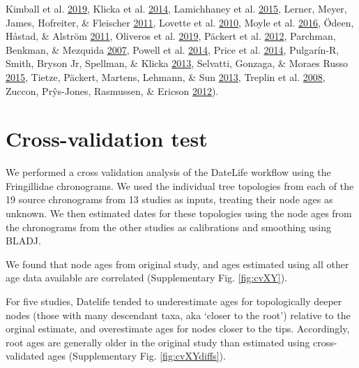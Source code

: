 \documentclass[
  man]{apa6}
\begin{document}
\begin{center}
{Kimball et al. \protect\hyperlink{ref-kimball2019phylogenomic}{2019},
Klicka et al. \protect\hyperlink{ref-klicka2014comprehensive}{2014},
Lamichhaney et al. \protect\hyperlink{ref-lamichhaney2015evolution}{2015},
Lerner, Meyer, James, Hofreiter, \& Fleischer \protect\hyperlink{ref-lerner2011multilocus}{2011},
Lovette et al. \protect\hyperlink{ref-lovette2010comprehensive}{2010},
Moyle et al. \protect\hyperlink{ref-moyle2016tectonic}{2016},
Ödeen, Håstad, \& Alström \protect\hyperlink{ref-odeen2011evolution}{2011},
Oliveros et al. \protect\hyperlink{ref-oliveros2019earth}{2019},
Päckert et al. \protect\hyperlink{ref-packert2012horizontal}{2012},
Parchman, Benkman, \& Mezquida \protect\hyperlink{ref-parchman2007coevolution}{2007},
Powell et al. \protect\hyperlink{ref-powell2014comprehensive}{2014},
Price et al. \protect\hyperlink{ref-price2014niche}{2014},
Pulgarín-R, Smith, Bryson Jr, Spellman, \& Klicka \protect\hyperlink{ref-pulgarin2013multilocus}{2013},
Selvatti, Gonzaga, \& Moraes Russo \protect\hyperlink{ref-selvatti2015paleogene}{2015},
Tietze, Päckert, Martens, Lehmann, \& Sun \protect\hyperlink{ref-tietze2013complete}{2013},
Treplin et al. \protect\hyperlink{ref-treplin2008molecular}{2008},
Zuccon, Prŷs-Jones, Rasmussen, \& Ericson \protect\hyperlink{ref-zuccon2012phylogenetic}{2012}).
}
\label{fig:fringillidae-topologies}
\end{center}

\hypertarget{cross-validation-test}{%
\section{Cross-validation test}\label{cross-validation-test}}

We performed a cross validation analysis of the DateLife workflow using the Fringillidae chronograms.
We used the individual tree topologies from each of the 19 source chronograms from 13 studies as inputs, treating their node ages as unknown.
We then estimated dates for these topologies using the node ages from the chronograms from the other studies as calibrations and smoothing using BLADJ.

We found that node ages from original study, and ages estimated using all other age data available are correlated (Supplementary Fig. \ref{fig:cvXY}).

For five studies, Datelife tended to underestimate ages for topologically deeper nodes (those with many descendant taxa, aka `closer to the root') relative to the orginal estimate, and overestimate ages for nodes closer to the tips.
Accordingly, root ages are generally older in the original study than estimated using cross-validated ages (Supplementary Fig. \ref{fig:cvXYdiffs}).
\end{document}
